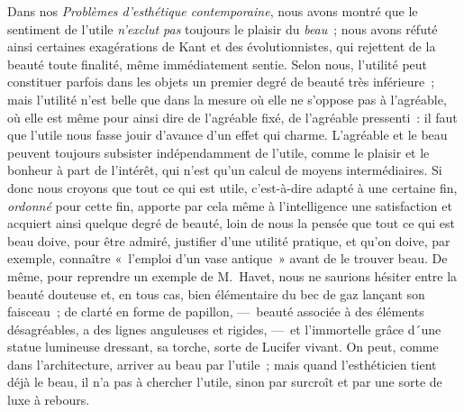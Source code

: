 \documentclass[french,twoside]{book} %
\begin{document}
Dans nos \emph{Problèmes d’esthétique contemporaine}, nous avons montré que le sentiment de l’utile \emph{n’exclut pas} toujours le plaisir du \emph{beau} ; nous avons réfuté ainsi certaines exagérations de Kant et des évolutionnistes, qui rejettent de la beauté toute finalité, même immédiatement sentie. Selon nous, l’utilité peut constituer parfois dans les objets un premier degré de beauté très inférieure ; mais l’utilité n’est belle que dans la mesure où elle ne s’oppose pas à l’agréable, où elle est même pour ainsi dire de l’agréable fixé, de l’agréable pressenti : il faut que l’utile nous fasse jouir d’avance d’un effet qui charme. L’agréable et le beau peuvent toujours subsister indépendamment de l’utile, comme le plaisir et le bonheur à part de l’intérêt, qui n’est qu’un calcul de moyens intermédiaires. Si donc nous croyons que tout ce qui est utile, c’est-à-dire adapté à une certaine fin, \emph{ordonné} pour cette fin, apporte par cela même à l’intelligence une satisfaction et acquiert ainsi quelque degré de beauté, loin de nous la pensée que tout ce qui est beau doive, pour être admiré, justifier d’une utilité pratique, et qu’on doive, par exemple, connaître « l’emploi d’un vase antique » avant de le trouver beau. De même, pour reprendre un exemple de M. Havet, nous ne saurions hésiter entre la beauté douteuse et, en tous cas, bien élémentaire du bec de gaz lançant son faisceau ; de clarté en forme de papillon, — beauté associée à des éléments désagréables, a des lignes anguleuses et rigides, — et l’immortelle grâce d´une statue lumineuse dressant, sa torche, sorte de Lucifer vivant. On peut, comme dans l’architecture, arriver au beau par l’utile ; mais quand l’esthéticien tient déjà le beau, il n’a pas à chercher l’utile, sinon par surcroît et par une sorte de luxe à rebours.\par
\end{document}

